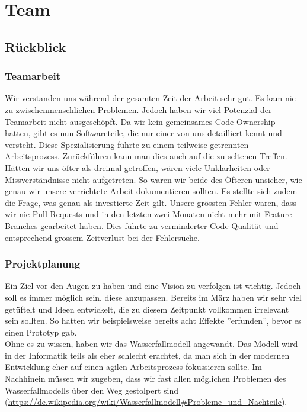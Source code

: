 \chapter{Team}

\section{Rückblick}

\subsection*{Teamarbeit}
Wir verstanden uns während der gesamten Zeit der Arbeit sehr gut. Es kam nie zu zwischenmenschlichen Problemen. Jedoch haben wir viel Potenzial der Teamarbeit nicht ausgeschöpft.
Da wir kein gemeinsames Code Ownership hatten, gibt es nun Softwareteile, die nur einer von uns detailliert kennt und versteht. Diese Spezialisierung führte zu einem teilweise getrennten Arbeitsprozess. Zurückführen kann man dies auch auf die zu seltenen
Treffen. Hätten wir uns öfter als dreimal getroffen, wären viele Unklarheiten oder Missverständnisse nicht aufgetreten. So waren wir beide des Öfteren unsicher, wie genau wir unsere verrichtete Arbeit
dokumentieren sollten. Es stellte sich zudem die Frage, was genau als investierte Zeit gilt.
Unsere grössten Fehler waren, dass wir nie Pull Requests und in den letzten zwei Monaten nicht mehr mit Feature Branches gearbeitet haben. Dies führte zu verminderter Code-Qualität
und entsprechend grossem Zeitverlust bei der Fehlersuche.


\subsection*{Projektplanung}
Ein Ziel vor den Augen zu haben und eine Vision zu verfolgen ist wichtig. Jedoch soll es
immer möglich sein, diese anzupassen. Bereits im März haben wir sehr viel getüftelt und Ideen entwickelt, die zu diesem Zeitpunkt vollkommen irrelevant sein sollten.
So hatten wir beispielsweise bereits acht Effekte ''erfunden'', bevor es einen Prototyp gab.\\
Ohne es zu wissen, haben wir das Wasserfallmodell angewandt. Das Modell wird in der Informatik teils als eher schlecht erachtet, da man sich in der modernen
Entwicklung eher auf einen agilen Arbeitsprozess fokussieren sollte. Im Nachhinein müssen wir zugeben, dass wir fast allen möglichen Problemen des Wasserfallmodells
über den Weg gestolpert sind (\url{https://de.wikipedia.org/wiki/Wasserfallmodell#Probleme_und_Nachteile}).


